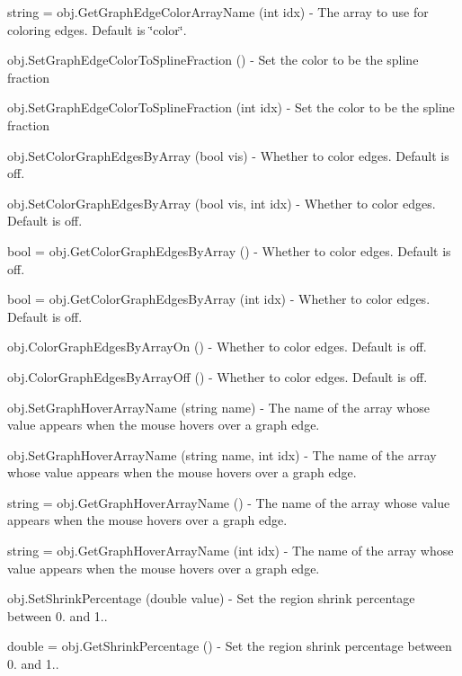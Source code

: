 \begin{DoxyItemize}
\item {\ttfamily string = obj.\-Get\-Graph\-Edge\-Color\-Array\-Name (int idx)} -\/ The array to use for coloring edges. Default is \char`\"{}color\char`\"{}.  
\item {\ttfamily obj.\-Set\-Graph\-Edge\-Color\-To\-Spline\-Fraction ()} -\/ Set the color to be the spline fraction  
\item {\ttfamily obj.\-Set\-Graph\-Edge\-Color\-To\-Spline\-Fraction (int idx)} -\/ Set the color to be the spline fraction  
\item {\ttfamily obj.\-Set\-Color\-Graph\-Edges\-By\-Array (bool vis)} -\/ Whether to color edges. Default is off.  
\item {\ttfamily obj.\-Set\-Color\-Graph\-Edges\-By\-Array (bool vis, int idx)} -\/ Whether to color edges. Default is off.  
\item {\ttfamily bool = obj.\-Get\-Color\-Graph\-Edges\-By\-Array ()} -\/ Whether to color edges. Default is off.  
\item {\ttfamily bool = obj.\-Get\-Color\-Graph\-Edges\-By\-Array (int idx)} -\/ Whether to color edges. Default is off.  
\item {\ttfamily obj.\-Color\-Graph\-Edges\-By\-Array\-On ()} -\/ Whether to color edges. Default is off.  
\item {\ttfamily obj.\-Color\-Graph\-Edges\-By\-Array\-Off ()} -\/ Whether to color edges. Default is off.  
\item {\ttfamily obj.\-Set\-Graph\-Hover\-Array\-Name (string name)} -\/ The name of the array whose value appears when the mouse hovers over a graph edge.  
\item {\ttfamily obj.\-Set\-Graph\-Hover\-Array\-Name (string name, int idx)} -\/ The name of the array whose value appears when the mouse hovers over a graph edge.  
\item {\ttfamily string = obj.\-Get\-Graph\-Hover\-Array\-Name ()} -\/ The name of the array whose value appears when the mouse hovers over a graph edge.  
\item {\ttfamily string = obj.\-Get\-Graph\-Hover\-Array\-Name (int idx)} -\/ The name of the array whose value appears when the mouse hovers over a graph edge.  
\item {\ttfamily obj.\-Set\-Shrink\-Percentage (double value)} -\/ Set the region shrink percentage between 0. and 1..  
\item {\ttfamily double = obj.\-Get\-Shrink\-Percentage ()} -\/ Set the region shrink percentage between 0. and 1..  

\end{DoxyItemize}
